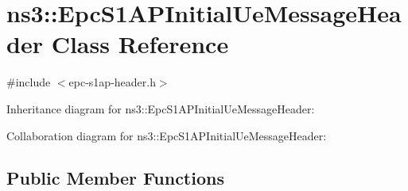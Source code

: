 \hypertarget{classns3_1_1EpcS1APInitialUeMessageHeader}{}\section{ns3\+:\+:Epc\+S1\+A\+P\+Initial\+Ue\+Message\+Header Class Reference}
\label{classns3_1_1EpcS1APInitialUeMessageHeader}


{\ttfamily \#include $<$epc-\/s1ap-\/header.\+h$>$}



Inheritance diagram for ns3\+:\+:Epc\+S1\+A\+P\+Initial\+Ue\+Message\+Header\+:


Collaboration diagram for ns3\+:\+:Epc\+S1\+A\+P\+Initial\+Ue\+Message\+Header\+:
\subsection*{Public Member Functions}
